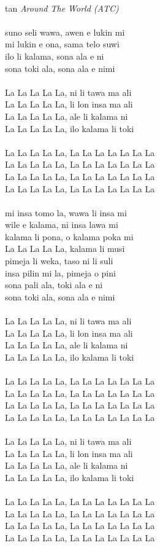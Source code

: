 \documentclass[a4paper]{amsbook}
\begin{document}
\begin{center}
~\\
tan {\itshape Around The World (ATC)}\\
~\\
suno seli wawa, awen e lukin mi\\
mi lukin e ona, sama telo suwi\\
ilo li kalama, sona ala e ni\\
sona toki ala, sona ala e nimi\\
~\\
La La La La La, ni li tawa ma ali\\
La La La La La, li lon insa ma ali\\
La La La La La, ale li kalama ni\\
La La La La La, ilo kalama li toki\\
~\\
La La La La La, La La La La La La La\\
La La La La La, La La La La La La La\\
La La La La La, La La La La La La La\\
La La La La La, La La La La La La La\\
~\\
mi insa tomo la, wawa li insa mi\\
wile e kalama, ni insa lawa mi\\
kalama li pona, o kalama poka mi\\
La La La La La, kalama li musi\\
pimeja li weka, taso ni li suli\\
insa pilin mi la, pimeja o pini\\
sona pali ala, toki ala e ni\\
sona toki ala, sona ala e nimi\\
~\\
La La La La La, ni li tawa ma ali\\
La La La La La, li lon insa ma ali\\
La La La La La, ale li kalama ni\\
La La La La La, ilo kalama li toki\\
~\\
La La La La La, La La La La La La La\\
La La La La La, La La La La La La La\\
La La La La La, La La La La La La La\\
La La La La La, La La La La La La La\\
~\\
La La La La La, ni li tawa ma ali\\
La La La La La, li lon insa ma ali\\
La La La La La, ale li kalama ni\\
La La La La La, ilo kalama li toki\\
~\\
La La La La La, La La La La La La La\\
La La La La La, La La La La La La La\\
La La La La La, La La La La La La La\\
La La La La La, La La La La La La La\\
\end{center}
\end{document}
